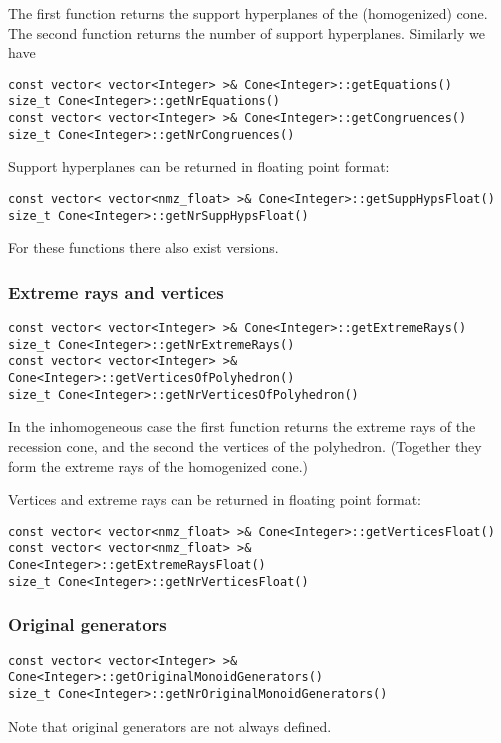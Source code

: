 \begin{small}
The first function returns the support hyperplanes of the (homogenized) cone.
The second function returns the number of support hyperplanes. Similarly we have

\begin{Verbatim}
const vector< vector<Integer> >& Cone<Integer>::getEquations()
size_t Cone<Integer>::getNrEquations()
const vector< vector<Integer> >& Cone<Integer>::getCongruences()
size_t Cone<Integer>::getNrCongruences()
\end{Verbatim}

Support hyperplanes can be returned in floating point format:
\begin{Verbatim}
const vector< vector<nmz_float> >& Cone<Integer>::getSuppHypsFloat()
size_t Cone<Integer>::getNrSuppHypsFloat()
\end{Verbatim}

For these functions there also exist versions.

\subsubsection{Extreme rays and vertices}

\begin{Verbatim}
const vector< vector<Integer> >& Cone<Integer>::getExtremeRays()
size_t Cone<Integer>::getNrExtremeRays()
const vector< vector<Integer> >& Cone<Integer>::getVerticesOfPolyhedron()
size_t Cone<Integer>::getNrVerticesOfPolyhedron()
\end{Verbatim}

In the inhomogeneous case the first function returns the extreme rays of the recession cone, and the second the vertices of the polyhedron. (Together they form the extreme rays of the homogenized cone.)

Vertices and extreme rays can be returned in floating point format:
\begin{Verbatim}
const vector< vector<nmz_float> >& Cone<Integer>::getVerticesFloat()
const vector< vector<nmz_float> >& Cone<Integer>::getExtremeRaysFloat()
size_t Cone<Integer>::getNrVerticesFloat()
\end{Verbatim}

\subsubsection{Original generators}

\begin{Verbatim}
const vector< vector<Integer> >& Cone<Integer>::getOriginalMonoidGenerators()
size_t Cone<Integer>::getNrOriginalMonoidGenerators()
\end{Verbatim}
Note that original generators are not always defined.


\end{small}
